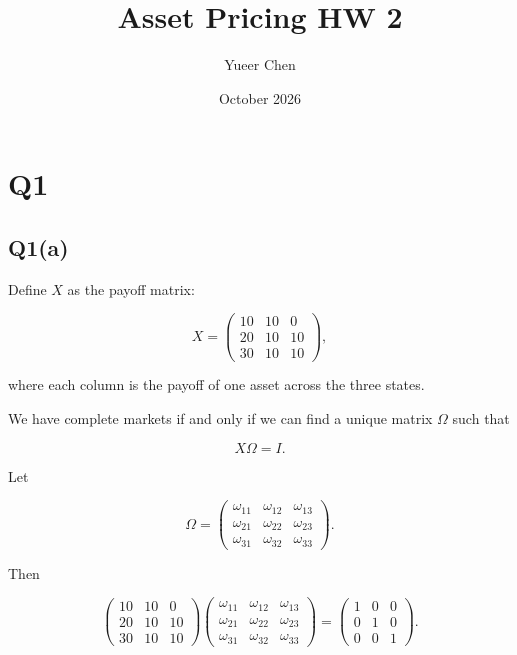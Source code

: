 \documentclass{article}
\title{Asset Pricing HW 2}
\author{Yueer Chen}
\date{October 2026}
\begin{document}
\maketitle





\section{Q1}

\subsection{Q1(a)}

Define \(X\) as the payoff matrix:

\[
X=
\begin{pmatrix}
10 & 10 & 0\\
20 & 10 & 10\\
30 & 10 & 10
\end{pmatrix},
\]

where each column is the payoff of one asset across the three states.

We have complete markets if and only if we can find a unique matrix \(\Omega\) such that

\[
X\Omega=I.
\]

Let

\[
\Omega=
\begin{pmatrix}
\omega_{11} & \omega_{12} & \omega_{13}\\
\omega_{21} & \omega_{22} & \omega_{23}\\
\omega_{31} & \omega_{32} & \omega_{33}
\end{pmatrix}.
\]

Then

\[
\begin{pmatrix}
10 & 10 & 0\\
20 & 10 & 10\\
30 & 10 & 10
\end{pmatrix}
\begin{pmatrix}
\omega_{11} & \omega_{12} & \omega_{13}\\
\omega_{21} & \omega_{22} & \omega_{23}\\
\omega_{31} & \omega_{32} & \omega_{33}
\end{pmatrix}
=
\begin{pmatrix}
1&0&0\\
0&1&0\\
0&0&1
\end{pmatrix}.
\]
\end{document}
